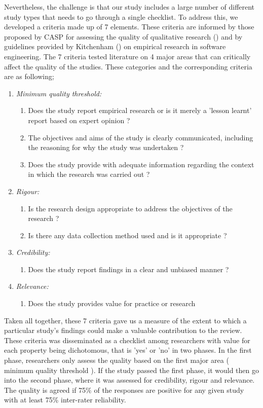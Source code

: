 \documentclass{ieeeaccess}
\begin{document}
Nevertheless, the challenge is that our study includes a large number of different study types that needs to go through a single checklist. To address this, we developed a criteria made up of 7 elements. These criteria are informed by those proposed by CASP for assessing the quality of qualitative research (\cite{CASP}) and by guidelines provided by Kitchenham (\cite{kitchenham2002preliminary}) on empirical research in software engineering. The 7 criteria tested literature on 4 major areas that can critically affect the quality of the studies. These categories and the corresponding criteria are as following;

\begin{enumerate}
    \item \emph{Minimum quality threshold:} 
    \begin{enumerate}
        \item Does the study report empirical research or is it merely a 'lesson learnt' report based on expert opinion ?
        \item The objectives and aims of the study is clearly communicated, including the reasoning for why the study was undertaken ? 
        \item Does the study provide with adequate information regarding the context in which the research was carried out ?
    \end{enumerate}
    \item \emph{Rigour:}
    \begin{enumerate}
        \item Is the research design appropriate to address the objectives of the research ?
        \item Is there any data collection method used and is it appropriate ?
    \end{enumerate}
    \item \emph{Credibility:}
      \begin{enumerate}
        \item Does the study report findings in a clear and unbiased manner ? 
     \end{enumerate}
    \item \emph{Relevance:}
    \begin{enumerate}
        \item Does the study provides value for practice or research 
     \end{enumerate}
\end{enumerate}

Taken all together, these 7 criteria gave us a measure of the extent to which a particular study's findings could make a valuable contribution to the review. These criteria was disseminated as a checklist among researchers with value for each property being dichotomous, that is 'yes' or 'no' in two phases. In the first phase, researchers only assess the quality based on the first major area ( minimum quality threshold ). If the study passed the first phase, it would then go into the second phase, where it was assessed for credibility, rigour and relevance. The quality is agreed if 75\% of the responses are positive for any given study with at least 75\% inter-rater reliability. 
\end{document}
